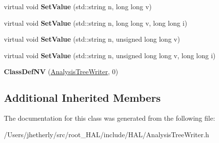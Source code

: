 \begin{DoxyCompactItemize}
\item 
\hypertarget{class_h_a_l_1_1_analysis_tree_writer_afe85388cdfb664339c9b1b5f031f1402}{virtual void {\bfseries Set\-Value} (std\-::string n, long long v)}\label{class_h_a_l_1_1_analysis_tree_writer_afe85388cdfb664339c9b1b5f031f1402}

\item 
\hypertarget{class_h_a_l_1_1_analysis_tree_writer_a34fd9453f3bc7cbfc9328d55495190ae}{virtual void {\bfseries Set\-Value} (std\-::string n, long long v, long long i)}\label{class_h_a_l_1_1_analysis_tree_writer_a34fd9453f3bc7cbfc9328d55495190ae}

\item 
\hypertarget{class_h_a_l_1_1_analysis_tree_writer_a79c8f3f6e7b6a0a97d261a01e26b3b95}{virtual void {\bfseries Set\-Value} (std\-::string n, unsigned long long v)}\label{class_h_a_l_1_1_analysis_tree_writer_a79c8f3f6e7b6a0a97d261a01e26b3b95}

\item 
\hypertarget{class_h_a_l_1_1_analysis_tree_writer_a8eefb4ab096631a2cccb43f8715c7d0d}{virtual void {\bfseries Set\-Value} (std\-::string n, unsigned long long v, long long i)}\label{class_h_a_l_1_1_analysis_tree_writer_a8eefb4ab096631a2cccb43f8715c7d0d}

\item 
\hypertarget{class_h_a_l_1_1_analysis_tree_writer_a77da0342b01b89846c418b825d3a9d99}{{\bfseries Class\-Def\-N\-V} (\hyperlink{class_h_a_l_1_1_analysis_tree_writer}{Analysis\-Tree\-Writer}, 0)}\label{class_h_a_l_1_1_analysis_tree_writer_a77da0342b01b89846c418b825d3a9d99}

\end{DoxyCompactItemize}
\subsection*{Additional Inherited Members}


The documentation for this class was generated from the following file\-:\begin{DoxyCompactItemize}
\item 
/\-Users/jhetherly/src/root\-\_\-\-H\-A\-L/include/\-H\-A\-L/Analysis\-Tree\-Writer.\-h\end{DoxyCompactItemize}
